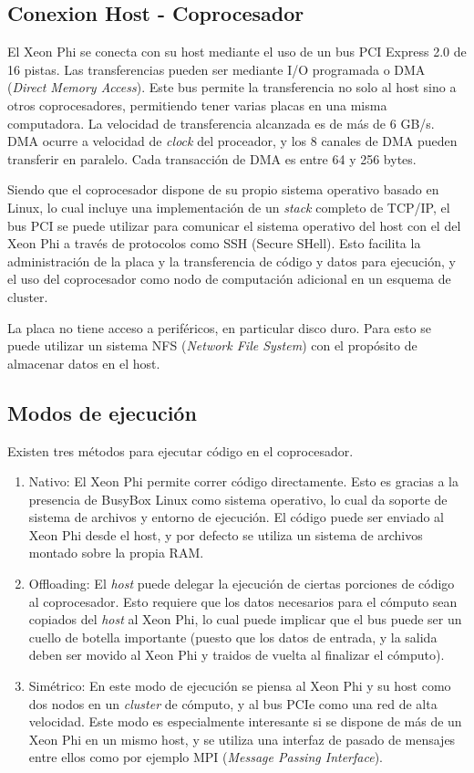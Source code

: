 \subsection{Conexion Host - Coprocesador}

El Xeon Phi se conecta con su host mediante el uso de un bus PCI Express 2.0 de 16 pistas. Las transferencias pueden ser
mediante I/O programada o DMA (\textit{Direct Memory Access}). Este bus permite la transferencia no solo al host sino a
otros coprocesadores, permitiendo tener varias placas en una misma computadora. La velocidad de transferencia alcanzada
es de m\'as de 6 GB/s. DMA ocurre a velocidad de \textit{clock} del proceador, y los 8 canales de DMA pueden transferir
en paralelo. Cada transacci\'on de DMA es entre 64 y 256 bytes.

Siendo que el coprocesador dispone de su propio sistema operativo basado en Linux, lo cual incluye una implementaci\'on
de un \textit{stack} completo de TCP/IP, el bus PCI se puede utilizar para comunicar el sistema operativo del host con
el del Xeon Phi a trav\'es de protocolos como SSH (Secure SHell). Esto facilita la administraci\'on de la placa y la
transferencia de c\'odigo y datos para ejecuci\'on, y el uso del coprocesador como nodo de computaci\'on adicional en un
esquema de cluster.

La placa no tiene acceso a perif\'ericos, en particular disco duro. Para esto se puede utilizar un sistema NFS (\textit{Network
File System}) con el prop\'osito de almacenar datos en el host.

\subsection{Modos de ejecuci\'on}

Existen tres m\'etodos para ejecutar c\'odigo en el coprocesador.

\begin{enumerate}
    \item Nativo: El Xeon Phi permite correr c\'odigo directamente. Esto es gracias a la presencia de BusyBox Linux como sistema operativo,
    lo cual da soporte de sistema de archivos y entorno de ejecuci\'on. El c\'odigo puede ser enviado al Xeon Phi desde el host, y por defecto se utiliza un sistema
    de archivos montado sobre la propia RAM. 
    \item Offloading: El \textit{host} puede delegar la ejecuci\'on de ciertas porciones de c\'odigo al coprocesador. 
    Esto requiere que los datos necesarios para el c\'omputo sean copiados del \textit{host} al Xeon Phi, lo cual puede implicar que el bus puede ser un cuello de botella 
    importante (puesto que los datos de entrada, y la salida deben ser movido al Xeon Phi y traidos de vuelta al finalizar el c\'omputo).
    \item Simétrico: En este modo de ejecuci\'on se piensa al Xeon Phi y su host como dos nodos en un \textit{cluster} de c\'omputo, y al bus PCIe como una red de alta velocidad.
    Este modo es especialmente interesante si se dispone de m\'as de un Xeon Phi en un mismo host, 
    y se utiliza una interfaz de pasado de mensajes entre ellos como por ejemplo MPI (\textit{Message Passing Interface}).
\end{enumerate}

